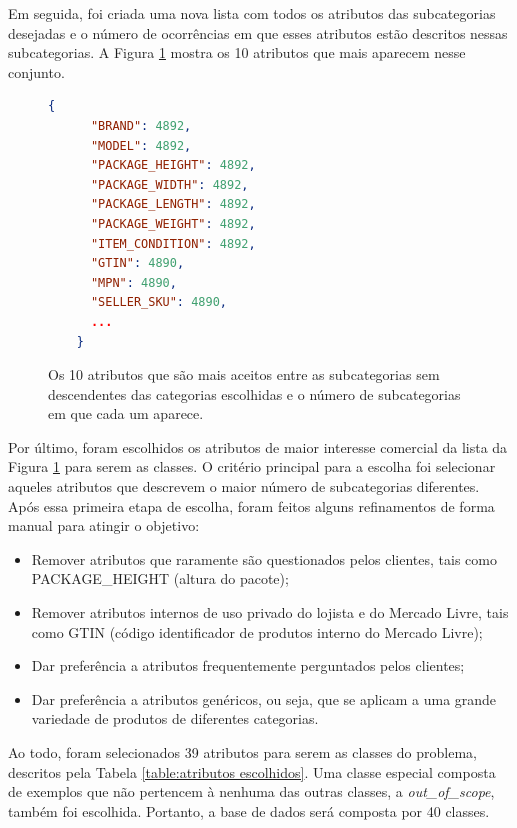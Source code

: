 Em seguida, foi criada uma nova lista com todos os atributos das subcategorias desejadas e o número de ocorrências em que esses atributos estão descritos nessas subcategorias. A Figura \ref{fig:top10_attributes} mostra os 10 atributos que mais aparecem nesse conjunto.

\begin{figure}[htb]
    \begin{lstlisting}[language=json,firstnumber=1]
    {
      "BRAND": 4892,
      "MODEL": 4892,
      "PACKAGE_HEIGHT": 4892,
      "PACKAGE_WIDTH": 4892,
      "PACKAGE_LENGTH": 4892,
      "PACKAGE_WEIGHT": 4892,
      "ITEM_CONDITION": 4892,
      "GTIN": 4890,
      "MPN": 4890,
      "SELLER_SKU": 4890,
      ...
    }
    \end{lstlisting}
    \caption{Os 10 atributos que são mais aceitos entre as subcategorias sem descendentes das categorias escolhidas e o número de subcategorias em que cada um aparece.}
    \label{fig:top10_attributes}
\end{figure}

Por último, foram escolhidos os atributos de maior interesse comercial da lista da Figura \ref{fig:top10_attributes} para serem as classes. O critério principal para a escolha foi selecionar aqueles atributos que descrevem o maior número de subcategorias diferentes. Após essa primeira etapa de escolha, foram feitos alguns refinamentos de forma manual para atingir o objetivo:

\begin{itemize}
  \item Remover atributos que raramente são questionados pelos clientes, tais como PACKAGE\_HEIGHT (altura do pacote);
  \item Remover atributos internos de uso privado do lojista e do Mercado Livre, tais como GTIN (código identificador de produtos interno do Mercado Livre);
  \item Dar preferência a atributos frequentemente perguntados pelos clientes;
  \item Dar preferência a atributos genéricos, ou seja, que se aplicam a uma grande variedade de produtos de diferentes categorias.
\end{itemize}

Ao todo, foram selecionados 39 atributos para serem as classes do problema, descritos pela Tabela \ref{table:atributos escolhidos}. Uma classe especial composta de exemplos que não pertencem à nenhuma das outras classes, a \textit{out\_of\_scope}, também foi escolhida. Portanto, a base de dados será composta por 40 classes.

